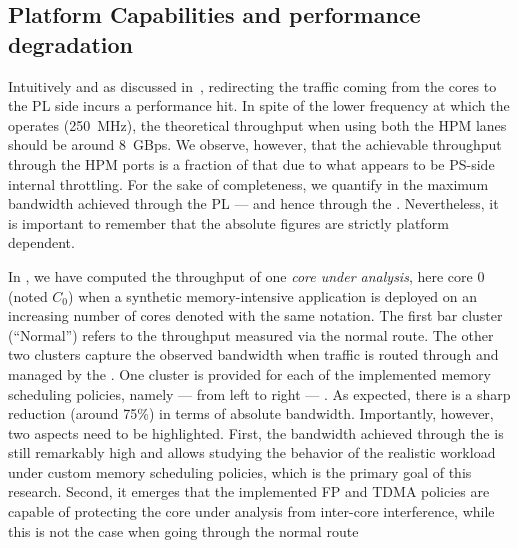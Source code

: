\subsection{Platform Capabilities and performance degradation}
\label{subsec:platform-capabilities-and-performance-degradation}
Intuitively and as discussed in~\cite{PLIM20}, redirecting the traffic
coming from the cores to the PL side incurs a performance hit. In
spite of the lower frequency at which the \schim operates (250~MHz),
the theoretical throughput when using both the HPM lanes should be
around 8~GBps. We observe, however, that the achievable throughput
through the HPM ports is a fraction of that due to what appears to be
PS-side internal throttling. For the sake of completeness, we quantify
in  the maximum bandwidth achieved
through the PL --- and hence through the \schim. Nevertheless, it is
important to remember that the absolute figures are strictly platform
dependent.

In , we have computed the throughput of
one \emph{core under analysis}, here core 0 (noted $C_{0}$) when a
synthetic memory-intensive application is deployed on an increasing
number of cores denoted with the same notation. The first bar cluster
(``Normal'') refers to the throughput measured via the normal
route. The other two clusters capture the observed bandwidth when
traffic is routed through and managed by the \schim.
One cluster is provided for each of the implemented memory scheduling policies,
namely --- from left to right --- .
As expected, there is a sharp reduction (around 75\%) in terms of absolute
bandwidth. Importantly, however, two aspects need to be
highlighted. First, the bandwidth achieved through the \schim is still
remarkably high and allows studying the behavior of the realistic workload
under custom memory scheduling policies, which is the primary goal of
this research. Second, it emerges that the implemented FP and TDMA
policies are capable of protecting the core under analysis from
inter-core interference, while this is not the case when going through
the normal route



